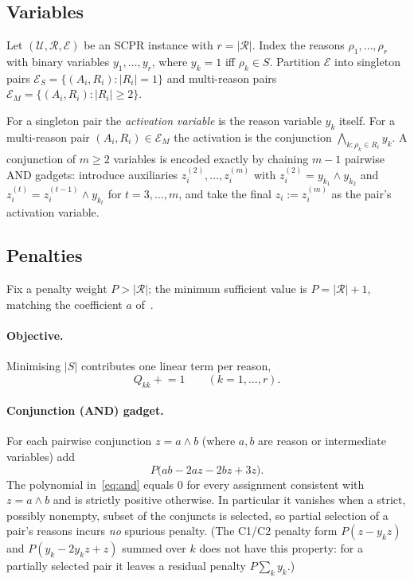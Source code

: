 \documentclass[11pt,a4paper]{article}
\theoremstyle{plain}
\theoremstyle{definition}
\theoremstyle{remark}
\newcommand{\U}{\mathcal{U}}
\newcommand{\R}{\mathcal{R}}
\newcommand{\E}{\mathcal{E}}
\newcommand{\SCPR}{\textup{SCPR}}
\newcommand{\abs}[1]{\lvert #1 \rvert}
\newcommand{\set}[1]{\{#1\}}
\begin{document}
\subsection{Variables}

Let $(\U, \R, \E)$ be an \SCPR{} instance with $r = \abs{\R}$. Index the reasons
$\rho_1, \ldots, \rho_r$ with binary variables $y_1, \ldots, y_r$, where
$y_k = 1$ iff $\rho_k \in S$. Partition $\E$ into singleton pairs
$\E_S = \set{(A_i, R_i) : \abs{R_i} = 1}$ and multi-reason pairs
$\E_M = \set{(A_i, R_i) : \abs{R_i} \ge 2}$.

For a singleton pair the \emph{activation variable} is the reason variable $y_k$
itself. For a multi-reason pair $(A_i, R_i) \in \E_M$ the activation is the
conjunction $\bigwedge_{k : \rho_k \in R_i} y_k$. A conjunction of $m \ge 2$
variables is encoded exactly by chaining $m-1$ pairwise \textup{AND} gadgets:
introduce auxiliaries $z_i^{(2)}, \ldots, z_i^{(m)}$ with
$z_i^{(2)} = y_{k_1} \wedge y_{k_2}$ and
$z_i^{(t)} = z_i^{(t-1)} \wedge y_{k_t}$ for $t = 3, \ldots, m$, and take the
final $z_i := z_i^{(m)}$ as the pair's activation variable.

\subsection{Penalties}

Fix a penalty weight $P > \abs{\R}$; the minimum sufficient value is
$P = \abs{\R} + 1$, matching the coefficient $a$ of~\cite{babatunde2025thesis}.

\paragraph{Objective.}
Minimising $\abs{S}$ contributes one linear term per reason,
\begin{equation}
  Q_{kk} \mathrel{+}= 1 \qquad (k = 1, \ldots, r).
  \label{eq:obj}
\end{equation}

\paragraph{Conjunction (\textup{AND}) gadget.}
For each pairwise conjunction $z = a \wedge b$ (where $a, b$ are reason or
intermediate variables) add
\begin{equation}
  P\bigl(ab - 2az - 2bz + 3z\bigr).
  \label{eq:and}
\end{equation}
The polynomial in~\eqref{eq:and} equals $0$ for every assignment consistent with
$z = a \wedge b$ and is strictly positive otherwise. In particular it vanishes
when a strict, possibly nonempty, subset of the conjuncts is selected, so partial
selection of a pair's reasons incurs \emph{no} spurious penalty. (The C1/C2
penalty form $P(z - y_k z)$ and $P(y_k - 2 y_k z + z)$ summed over $k$ does not
have this property: for a partially selected pair it leaves a residual penalty
$P \sum_k y_k$.)
\end{document}
